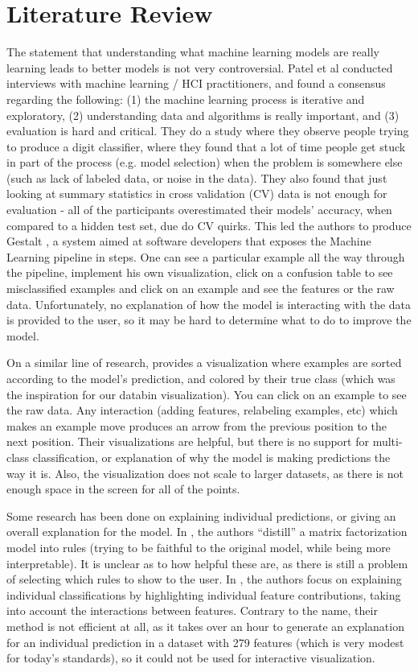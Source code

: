 \documentclass{chi2009}
\begin{document}
\section{Literature Review}
The statement that understanding what machine learning models are really
learning leads to better models is not very controversial.  Patel et al
\cite{Patel:2008:ISM:1357054.1357160} conducted interviews with machine learning
/ HCI practitioners, and found a consensus regarding the following: (1) the
machine learning process is iterative and exploratory, (2) understanding data
and algorithms is really important, and (3) evaluation is hard and critical.
They do a study where they observe people trying to produce a digit classifier,
where they found that a lot of time people get stuck in part of the process
(e.g. model selection) when the problem is somewhere else (such as lack of
labeled data, or noise in the data). They also found that just looking at
summary statistics in cross validation (CV) data is not enough for evaluation -
all of the participants overestimated their models’ accuracy, when compared to a
hidden test set, due do CV quirks. This led the authors to produce Gestalt
\cite{gestalt}, a system aimed at software developers that exposes the Machine
Learning pipeline in steps. One can see a particular example all the way through
the pipeline, implement his own visualization, click on a confusion table to see
misclassified examples and click on an example and see the features or the raw
data. Unfortunately, no explanation of how the model is interacting with the
data is provided to the user, so it may be hard to determine what to do to
improve the model.

On a similar line of research, \cite{modeltracker} provides a
visualization where examples are sorted according to the model's prediction, and
colored by their true class (which was the inspiration for our databin
visualization). You can click on an example to see the raw data. Any interaction
(adding features, relabeling examples, etc) which makes an example move produces
an arrow from the previous position to the next position. Their visualizations
are helpful, but there is no support for multi-class classification, or
explanation of why the model is making predictions the way it is. Also, the
visualization does not scale to larger datasets, as there is not enough space in
the screen for all of the points.

Some research has been done on explaining individual predictions, or giving an
overall explanation for the model. In \cite{explain:krr15}, the authors
``distill'' a matrix factorization model into rules (trying to be faithful to
the original model, while being more interpretable). It is unclear as to how
helpful these are, as there is still a problem of selecting which rules to show
to the user. In \cite{Strumbelj:2010:EEI:1756006.1756007}, the authors focus on
explaining individual classifications by highlighting individual feature
contributions, taking into account the interactions between features. Contrary
to the name, their method is not efficient at all, as it takes over an hour to
generate an explanation for an individual prediction in a dataset with 279
features (which is very modest for today's standards), so it could not be used
for interactive visualization.
\end{document}
